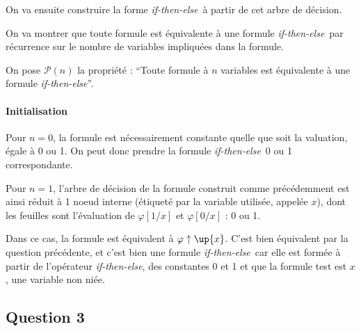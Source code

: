 \documentclass[12pt]{article}
\def\question#1{\subsection*{Question #1}}
\def\phix{\varphi\uparrow\up{x}}
\def\ite{\textit{if-then-else}}
\def\P{\mathcal{P}}
\begin{document}
On va ensuite construire la forme \ite\ à partir de cet arbre de décision.

On va montrer que toute formule est équivalente à une formule \ite\ par récurrence sur le nombre de variables impliquées dans la formule.

On pose $\P(n)$ la propriété : ``Toute formule à $n$ variables est équivalente à une formule \ite''.

\paragraph{Initialisation} 
Pour $n=0$, la formule est nécessairement constante quelle que soit la valuation, égale à 0 ou 1. On peut donc prendre la formule \ite\ 0 ou 1 correspondante.

Pour $n=1$, l'arbre de décision de la formule construit comme précédemment est ainsi réduit à 1 noeud interne (étiqueté par la variable utilisée, appelée $x$), dont les feuilles sont l'évaluation de $\varphi [ 1/x ]$ et $\varphi [ 0/x ]$ : 0 ou 1.

Dans ce cas, la formule est équivalent à $\phix$. C'est bien équivalent par la question précédente, et c'est bien une formule \ite\ car elle est formée à partir de l'opérateur \ite, des constantes 0 et 1 et que la formule test est $x$, une variable non niée.


\question{3}
\end{document}
